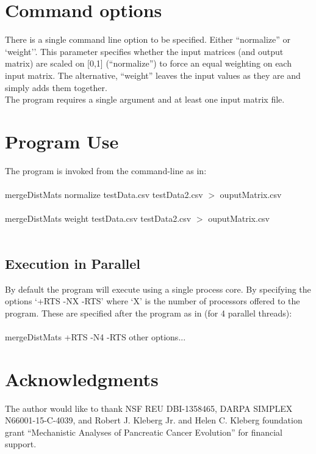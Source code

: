 \documentclass[11pt]{memoir}
\begin{document}
	\section{Command options}
	There is a single command line option to be specified.  Either ``normalize'' or `weight''.  This parameter specifies
	whether the input matrices (and output matrix) are scaled on [0,1] (``normalize'') to force an equal weighting on each input matrix.  
	The alternative, ``weight'' leaves the input values as they are and simply adds them together. \\

	

	\noindent The program requires  a single argument and at least one input matrix file.

	
	\section{Program Use}
	The program is invoked from the command-line as in:\\
	\\
	mergeDistMats normalize testData.csv testData2.csv $>$ ouputMatrix.csv\\ \\
	mergeDistMats weight testData.csv testData2.csv $>$ ouputMatrix.csv\\ \\
	
	\subsection{Execution in Parallel}
	By default the program will execute using a single process core.  By specifying the options `+RTS -NX -RTS' where `X' is the number of processors offered to the program. These are specified after the program as in (for 4 parallel threads):\\
	\\
	mergeDistMats +RTS -N4 -RTS other options...  \\
	
	\section*{Acknowledgments}
	The author would like to thank NSF REU DBI-1358465, DARPA SIMPLEX N66001-15-C-4039, and Robert J. Kleberg Jr. and Helen C. Kleberg foundation grant ``Mechanistic Analyses of Pancreatic Cancer Evolution'' for financial support.  
	
\end{document}
